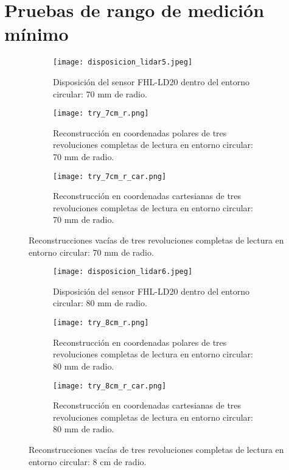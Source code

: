 \section{Pruebas de rango de medición mínimo}
\label{min_pruebas}
\begin{figure}[H]
	\centering
	\begin{subfigure}{0.6\textwidth}
		\centering
		\texttt{[image: disposicion\_lidar5.jpeg]}
		\caption{Disposición del sensor FHL-LD20 dentro del entorno circular: 70 mm de radio.}
		\label{disposicion_lidar5}
		\vspace{1em}
	\end{subfigure}
	\begin{subfigure}{0.45\textwidth}
		\centering
		\texttt{[image: try\_7cm\_r.png]}
		\caption{Reconstrucción en coordenadas polares de tres revoluciones completas de lectura en entorno circular: 70 mm de radio.}
		\label{try_7cm_r}
	\end{subfigure}
	\hspace{1em}
	\begin{subfigure}{0.45\textwidth}
		\centering
		\texttt{[image: try\_7cm\_r\_car.png]}
		\caption{Reconstrucción en coordenadas cartesianas de tres revoluciones completas de lectura en entorno circular: 70 mm de radio.}
		\label{try_7cm_r_car}
	\end{subfigure}
	\caption{Reconstrucciones vacías de tres revoluciones completas de lectura en entorno circular:  70 mm de radio.}
	\label{fig: reconstrucciones_vacías_7}
\end{figure}

\begin{figure}[H]
	\centering
	\begin{subfigure}{0.6\textwidth}
		\centering
		\texttt{[image: disposicion\_lidar6.jpeg]}
		\caption{Disposición del sensor FHL-LD20 dentro del entorno circular: 80 mm de radio.}
		\label{disposicion_lidar6}
		\vspace{1em}
	\end{subfigure}
	\begin{subfigure}{0.45\textwidth}
		\centering
		\texttt{[image: try\_8cm\_r.png]}
		\caption{Reconstrucción en coordenadas polares de tres revoluciones completas de lectura en entorno circular: 80 mm de radio.}
		\label{try_8cm_r}
	\end{subfigure}
	\hspace{1em}
	\begin{subfigure}{0.45\textwidth}
		\centering
		\texttt{[image: try\_8cm\_r\_car.png]}
		\caption{Reconstrucción en coordenadas cartesianas de tres revoluciones completas de lectura en entorno circular: 80 mm de radio.}
		\label{try_8cm_r_car}
	\end{subfigure}
	\caption{Reconstrucciones vacías de tres revoluciones completas de lectura en entorno circular: 8 cm de radio.}
	\label{fig: reconstrucciones_vacías_8}
\end{figure}

